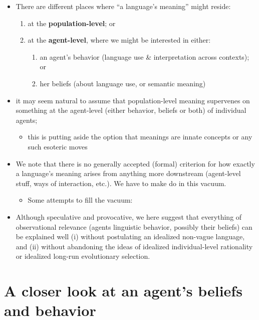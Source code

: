\documentclass[fleqn,reqno,10pt]{article}
\begin{document}
\begin{itemize}
\item There are different places where ``a language's meaning'' might reside:
  \begin{enumerate}
  \item at the \textbf{population-level}; or
  \item at the \textbf{agent-level}, where we might be interested in either:
  \begin{enumerate}
    \item an agent's behavior (language use \& interpretation across contexts); or
    \item her beliefs (about language use, or semantic meaning)
  \end{enumerate}
\end{enumerate}
\item it may seem natural to assume that population-level meaning supervenes on something at
  the agent-level (either behavior, beliefs or both) of individual agents;
  \begin{itemize}
  \item this is putting aside the option that meanings are innate concepts or any such
    esoteric moves
  \end{itemize}
\item We note that there is no generally accepted (formal) criterion for how exactly a
  language's meaning arises from anything more downstream (agent-level stuff, ways of
  interaction, etc.). We have to make do in this vacuum.
  \begin{itemize}
  \item Some attempts to fill the vacuum:
    \citet{Harms2004:Information-and,Harms2010:Determining-tru,Franke2013:An-adaptationis}
  \end{itemize}
\item Although speculative and provocative, we here suggest that everything of observational
  relevance (agents linguistic behavior, possibly their beliefs) can be explained well (i)
  without postulating an idealized non-vague language, and (ii) without abandoning the ideas of
  idealized individual-level rationality or idealized long-run evolutionary selection.
\end{itemize}


\section*{A closer look at an agent's beliefs and behavior}
\end{document}
